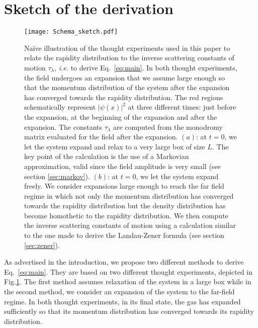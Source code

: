 \documentclass[submission,Phys,10pt]{SciPost}%
\begin{document}
\section{Sketch of the derivation}

 
\begin{figure}[h]
    \centering
    \texttt{[image: Schema\_sketch.pdf]}
       \caption{Na\"ive illustration of the thought experiments used in this paper 
     to relate the rapidity distribution to the inverse scattering  constants of motion  $\tau_\lambda$, {\it i.e.} to derive Eq.~\eqref{eq:main}. 
     In both thought experiments, the field undergoes an expansion that we assume large enough so that the momentum distribution
     of the system after the expansion has converged towards the rapidity distribution.
     The red regions schematically represent  
     $|\psi(x)|^2$ at three different times: just before the expansion, at the beginning of the expansion and after the expansion. 
     The constants $\tau_\lambda$ are computed from  the monodromy matrix evaluated for the field after the expansion. $(a)$: at $t=0$, we let the system expand and relax to a very large box
     of size $L$.
     The key point of the calculation  is the use of a  Markovian approximation, valid since the field amplitude is very small (see section \ref{sec:markov}). 
     $(b)$: at $t=0$, we let the system expand freely. We consider  expansions large enough to reach  the far field regime in which
     not only the momentum
     distribution has converged towards the rapidity distribution %
     but the %
     density distribution has become homothetic to the
     rapidity distribution. %
     We then compute the inverse scattering constants of motion using a calculation
     similar to the one made to derive the Landau-Zener formula (see section \ref{sec:zener}).     
   }
   \label{fig:sketch}
\end{figure}
 
As advertised in the introduction, we propose two different methods to derive Eq.~\eqref{eq:main}. They are based on two different thought experiments, depicted in Fig.\ref{fig:sketch}. The first method assumes relaxation of the system in a large box while in the second method, we consider an expansion of the system to the
far-field regime.  
In both thought experiments, in its final state, the gas has expanded sufficiently so that its momentum distribution has converged towards its rapidity distribution. 
\end{document}
